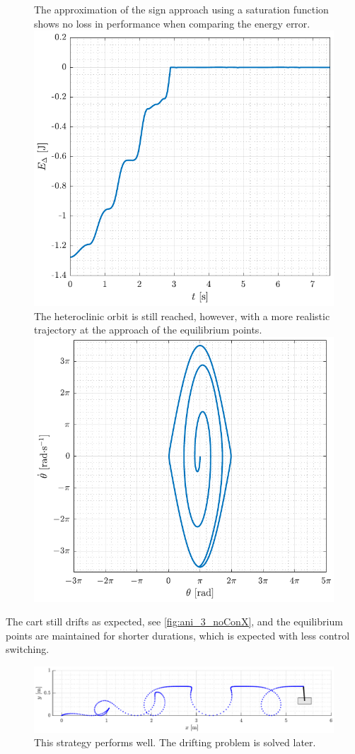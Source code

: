 \begin{figure}[H]
  \hspace{-10pt}
  \captionbox
  {
    The approximation of the sign approach using a saturation function shows no loss in performance when comparing the energy error.
    \label{fig:Edelta_3_noConX}
  }
  {
    \hspace{-1cm}
    \includegraphics[width=.448\textwidth]{figures/Edelta_3_noConX}
  }
  \hspace{20pt}
  \captionbox 
  {
    The heteroclinic orbit is still reached, however, with a more realistic trajectory at the approach of the equilibrium points.
    \label{fig:phase_3_noConX}
  }
  {
    \hspace{-1cm}
    \includegraphics[width=.46\textwidth]{figures/phase_3_noConX}
  }  
\end{figure}
%
The cart still drifts as expected, see \autoref{fig:ani_3_noConX}, and the equilibrium points are maintained for shorter durations, which is expected with less control switching.
%
\begin{figure}[H]
  \includegraphics[width=.7\textwidth]{figures/ani_3_noConX}
  \caption{This strategy performs well. The drifting problem is solved later.}
  \label{fig:ani_3_noConX}
\end{figure}
